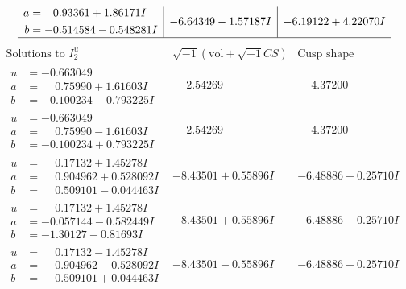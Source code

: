 \documentclass[1p]{elsarticle_modified}
\theoremstyle{definition}
\newcommand{\I}{\sqrt{-1}}
\begin{document}
$$\begin{array}{c|c|c}
\begin{aligned}
a &= \phantom{-}0.93361 + 1.86171 I \\
b &= -0.514584 - 0.548281 I\end{aligned}
 & -6.64349 - 1.57187 I & -6.19122 + 4.22070 I\\
 \hline 
 \end{array}$$\newpage$$\begin{array}{c|c|c}  
\text{Solutions to }I^u_{2}& \I (\text{vol} + \sqrt{-1}CS) & \text{Cusp shape}\\
 \hline 
\begin{aligned}
u &= -0.663049\phantom{ +0.000000I} \\
a &= \phantom{-}0.75990 + 1.61603 I \\
b &= -0.100234 - 0.793225 I\end{aligned}
 & \phantom{-}2.54269\phantom{ +0.000000I} & \phantom{-}4.37200\phantom{ +0.000000I} \\ \hline\begin{aligned}
u &= -0.663049\phantom{ +0.000000I} \\
a &= \phantom{-}0.75990 - 1.61603 I \\
b &= -0.100234 + 0.793225 I\end{aligned}
 & \phantom{-}2.54269\phantom{ +0.000000I} & \phantom{-}4.37200\phantom{ +0.000000I} \\ \hline\begin{aligned}
u &= \phantom{-}0.17132 + 1.45278 I \\
a &= \phantom{-}0.904962 + 0.528092 I \\
b &= \phantom{-}0.509101 - 0.044463 I\end{aligned}
 & -8.43501 + 0.55896 I & -6.48886 + 0.25710 I \\ \hline\begin{aligned}
u &= \phantom{-}0.17132 + 1.45278 I \\
a &= -0.057144 - 0.582449 I \\
b &= -1.30127 - 0.81693 I\end{aligned}
 & -8.43501 + 0.55896 I & -6.48886 + 0.25710 I \\ \hline\begin{aligned}
u &= \phantom{-}0.17132 - 1.45278 I \\
a &= \phantom{-}0.904962 - 0.528092 I \\
b &= \phantom{-}0.509101 + 0.044463 I\end{aligned}
 & -8.43501 - 0.55896 I & -6.48886 - 0.25710 I \\ \hline\begin{aligned}

\end{aligned}
\end{array}$$
\end{document}

